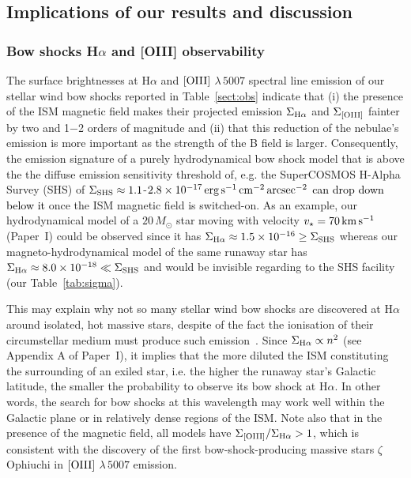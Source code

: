 \documentclass[useAMS,usenatbib]{mn2e}
\begin{document}


\subsection{Implications of our results and discussion}
\label{sect:implication}


\subsubsection{Bow shocks H$\alpha$ and [OIII] observability}
\label{sect:observability}


The surface brightnesses at H$\alpha$ and $[\rm O{\sc III}]$ $\lambda \, 5007$
spectral line emission of our stellar wind bow shocks reported in
Table~\ref{sect:obs} indicate that (i) the presence of the ISM magnetic field makes their
projected emission $\Sigma_{\rm H \alpha}$ and $\Sigma_{[\rm OIII]}$ fainter by
two and 1$-$2 orders of magnitude and (ii) that this reduction of the nebulae's
emission is more important as the strength of the B field is larger.
Consequently, the emission signature of a purely hydrodynamical bow shock model
that is above the the diffuse emission sensitivity threshold of, e.g. the
SuperCOSMOS H-Alpha Survey (SHS) of $\Sigma_{\rm SHS}\approx1.1$-$2.8\times
10^{-17}\, \rm erg\, \rm s^{-1}\, \rm cm^{-2}\, \rm arcsec^{-2}$ \textcolor{black}{can drop down below it} 
once the ISM magnetic field is switched-on. As an example, our
hydrodynamical model of a $20\, M_{\odot}$ star moving with velocity
$v_{\star}=70\, \rm km\, \rm s^{-1}$ (Paper~I) could be observed since it has
$\Sigma_{\rm H \alpha}\approx 1.5\times 10^{-16} \ge \Sigma_{\rm SHS}$ whereas
our magneto-hydrodynamical model of the same runaway star has $\Sigma_{\rm H
\alpha}\approx 8.0\times 10^{-18} \ll \Sigma_{\rm SHS}$ and would be invisible
regarding to the SHS facility (our Table~\ref{tab:sigma}). 


This may explain why not so many stellar wind bow shocks are discovered at 
H$\alpha$ around isolated, hot massive stars, despite of the fact the ionisation 
of their circumstellar medium must produce such 
emission~\citep{brown_aa_439_2005}. Since $\Sigma_{\rm H \alpha}\propto n^{2}$ 
(see Appendix A of Paper~I), it implies that the more diluted the ISM 
constituting the surrounding of an exiled star, i.e. the higher the runaway 
star's Galactic latitude, the smaller the probability to observe its bow shock 
at H$\alpha$. In other words, the search for bow shocks at this wavelength may 
work well within the Galactic plane or in relatively dense regions of the ISM. 
Note also that in the presence of the magnetic field, all models have 
$\Sigma_{[\rm OIII]}/\Sigma_{\rm H \alpha}>1$, which is consistent with the 
discovery of the first bow-shock-producing massive stars $\zeta$ Ophiuchi in 
$[\rm OIII]$ $\lambda \, 5007$ emission. 
\end{document}
